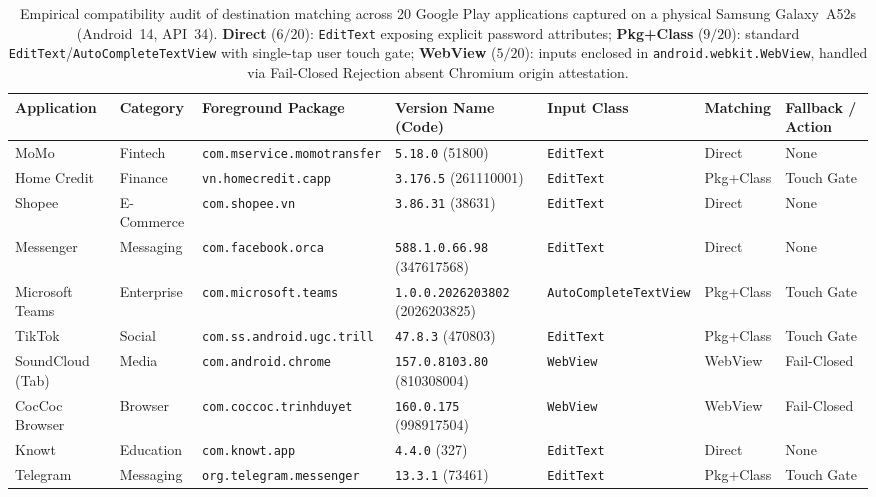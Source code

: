 \begin{table}[t]
\centering\scriptsize
\renewcommand{\arraystretch}{0.95}
\setlength{\tabcolsep}{3.5pt}
\caption{Empirical compatibility audit of \SH{} destination matching across 20 Google Play applications captured on a physical Samsung Galaxy~A52s (Android~14, API~34). \textbf{Direct} ($6/20$): \texttt{EditText} exposing explicit password attributes; \textbf{Pkg+Class} ($9/20$): standard \texttt{EditText}/\texttt{AutoCompleteTextView} with single-tap user touch gate; \textbf{WebView} ($5/20$): inputs enclosed in \texttt{android.webkit.WebView}, handled via Fail-Closed Rejection absent Chromium origin attestation.}
\label{tab:app_compatibility}
\begin{tabular*}{\textwidth}{@{\extracolsep{\fill}}lllllll@{}}
\toprule
Application & Category & Foreground Package & Version Name (Code) & Input Class & Matching & Fallback / Action \\
\midrule
MoMo & Fintech & \texttt{com.mservice.momotransfer} & \texttt{5.18.0} (51800) & \texttt{EditText} & Direct & None \\
Home Credit & Finance & \texttt{vn.homecredit.capp} & \texttt{3.176.5} (261110001) & \texttt{EditText} & Pkg+Class & Touch Gate \\
Shopee & E-Commerce & \texttt{com.shopee.vn} & \texttt{3.86.31} (38631) & \texttt{EditText} & Direct & None \\
Messenger & Messaging & \texttt{com.facebook.orca} & \texttt{588.1.0.66.98} (347617568) & \texttt{EditText} & Direct & None \\
Microsoft Teams & Enterprise & \texttt{com.microsoft.teams} & \texttt{1.0.0.2026203802} (2026203825) & \texttt{AutoCompleteTextView} & Pkg+Class & Touch Gate \\
TikTok & Social & \texttt{com.ss.android.ugc.trill} & \texttt{47.8.3} (470803) & \texttt{EditText} & Pkg+Class & Touch Gate \\
SoundCloud (Tab) & Media & \texttt{com.android.chrome} & \texttt{157.0.8103.80} (810308004) & \texttt{WebView} & WebView & Fail-Closed \\
CocCoc Browser & Browser & \texttt{com.coccoc.trinhduyet} & \texttt{160.0.175} (998917504) & \texttt{WebView} & WebView & Fail-Closed \\
Knowt & Education & \texttt{com.knowt.app} & \texttt{4.4.0} (327) & \texttt{EditText} & Direct & None \\
Telegram & Messaging & \texttt{org.telegram.messenger} & \texttt{13.3.1} (73461) & \texttt{EditText} & Pkg+Class & Touch Gate \\

\end{tabular*}
\end{table}
